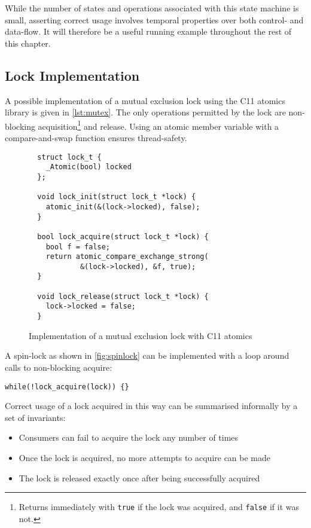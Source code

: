 While the number of states and operations associated with this state machine is
small, asserting correct usage involves temporal properties over both control-
and data-flow. It will therefore be a useful running example throughout the rest
of this chapter.

\subsection{Lock Implementation}

A possible implementation of a mutual exclusion lock using the C11
atomics library is given in \autoref{lst:mutex}. The only operations
permitted by the lock are non-blocking acquisition\footnote{Returns immediately
with \texttt{true} if the lock was acquired, and
\texttt{false} if it was not.} and release. Using an atomic
member variable with a compare-and-swap function ensures thread-safety.

\begin{figure}
  \begin{verbatim}
  struct lock_t {
    _Atomic(bool) locked
  };

  void lock_init(struct lock_t *lock) {
    atomic_init(&(lock->locked), false);
  }

  bool lock_acquire(struct lock_t *lock) {
    bool f = false;
    return atomic_compare_exchange_strong(
            &(lock->locked), &f, true);
  }

  void lock_release(struct lock_t *lock) {
    lock->locked = false;
  }
  \end{verbatim}
  \caption{Implementation of a mutual exclusion lock with C11 atomics}
  \label{lst:mutex}
\end{figure}

A spin-lock as shown in \autoref{fig:spinlock} can be implemented with a
loop around calls to non-blocking acquire:

\begin{verbatim}
while(!lock_acquire(lock)) {}
\end{verbatim}

Correct usage of a lock acquired in this way can be summarised
informally by a set of invariants:
\begin{itemize}
  \item Consumers can fail to acquire the lock any number of times
  \item Once the lock is acquired, no more attempts to acquire can be made
  \item The lock is released exactly once after being successfully acquired
\end{itemize}

